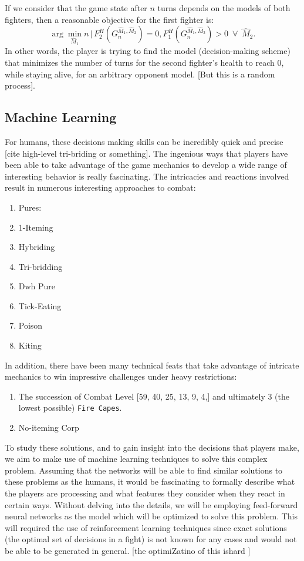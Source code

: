 		If we consider that the game state after $n$ turns depends on the models of both fighters, then a reasonable objective for the first fighter is:
		\begin{equation}
			\arg \min_{\hat M_1} n\,|\, F_2^H (G_{n}^{\hat M_1, \hat M_2}) = 0, F_1^H (G_{n}^{\hat M_1, \hat M_2}) > 0\,\,\,\forall\,\,\, \hat M_2.
		\end{equation}
		In other words, the player is trying to find the model (decision-making scheme) that minimizes the number of turns for the second fighter's health to reach 0, while staying alive, for an arbitrary opponent model.  [But this is a random process].
		 
	\subsection{Machine Learning}
		For humans, these decisions making skills can be incredibly quick and precise [cite high-level tri-briding or something]. The ingenious ways that players have been able to take advantage of the game mechanics to develop a wide range of interesting behavior is really fascinating. The intricacies and reactions involved result in numerous interesting approaches to combat:
		\begin{enumerate}
			\item Pures:
			\item 1-Iteming
			\item Hybriding
			\item Tri-bridding
			\item Dwh Pure
			\item Tick-Eating
			\item Poison
			\item Kiting
		\end{enumerate}
		In addition, there have been many technical feats that take advantage of intricate mechanics to win impressive challenges under heavy restrictions:
		\begin{enumerate}
			\item The succession of Combat Level [59, 40, 25, 13, 9, 4,] and ultimately 3 (the lowest possible) \texttt{Fire Capes}.
			\item No-iteming Corp
		\end{enumerate}

		To study these solutions, and to gain insight into the decisions that players make, we aim to make use of machine learning techniques to solve this complex problem. Assuming that the networks will be able to find similar solutions to these problems as the humans, it would be fascinating to formally describe what the players are processing and what features they consider when they react in certain ways. Without delving into the details, we will be employing feed-forward neural networks as the model which will be optimized to solve this problem. This will required the use of reinforcement learning techniques since exact solutions (the optimal set of decisions in a fight) is not known for any cases and would not be able to be generated in general.  [the optimiZatino of this ishard ]


